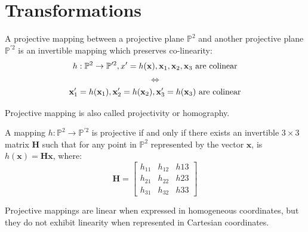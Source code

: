 \section{Transformations}

\begin{definition}
    A projective mapping between a projective plane $\mathbb{P}^2$ and another projective plane $\mathbb{P}^{\prime 2}$ is an invertible mapping which preserves co-linearity:
    \[h:\mathbb{P}^2 \rightarrow \mathbb{P}^{\prime 2}, x^\prime=h(\mathbf{x}),\mathbf{x}_1,\mathbf{x}_2,\mathbf{x}_3 \textnormal{ are colinear}\]
    \[\Leftrightarrow\]
    \[\mathbf{x}_1^\prime=h(\mathbf{x}_1),\mathbf{x}_2^\prime=h(\mathbf{x}_2),\mathbf{x}_3^\prime=h(\mathbf{x}_3) \textnormal{ are colinear}\]
\end{definition}
Projective mapping is also called projectivity or homography. 
\begin{theorem}
    A mapping $h:\mathbb{P}^{2} \rightarrow \mathbb{P}^{\prime 2}$ is projective if and only if there exists an invertible $3 \times 3$ matrix $\mathbf{H}$ such that for any point in $\mathbb{P}^{2}$ represented by the vector $\mathbf{x}$, is $h(\mathbf{x})=\mathbf{Hx}$, where: 
    \[\mathbf{H}=\begin{bmatrix}
        h_{11} & h_{12} & h{13} \\
        h_{21} & h_{22} & h{23} \\
        h_{31} & h_{32} & h{33} 
    \end{bmatrix}\]
\end{theorem}
Projective mappings are linear when expressed in homogeneous coordinates, but they do not exhibit linearity when represented in Cartesian coordinates.

